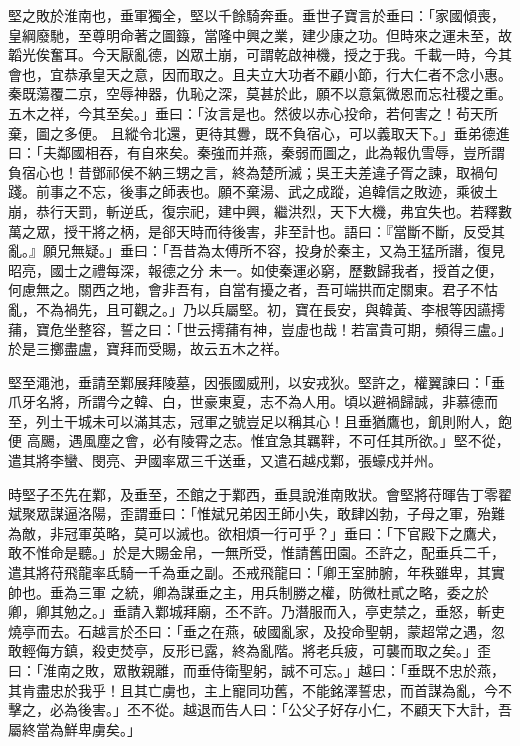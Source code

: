 \begin{pinyinscope}
 堅之敗於淮南也，垂軍獨全，堅以千餘騎奔垂。垂世子寶言於垂曰：「家國傾喪，皇綱廢馳，至尊明命著之圖籙，當隆中興之業，建少康之功。但時來之運未至，故韜光俟奮耳。今天厭亂德，凶眾土崩，可謂乾啟神機，授之于我。千載一時，今其會也，宜恭承皇天之意，因而取之。且夫立大功者不顧小節，行大仁者不念小惠。秦既蕩覆二京，空辱神器，仇恥之深，莫甚於此，願不以意氣微恩而忘社稷之重。五木之祥，今其至矣。」垂曰：「汝言是也。然彼以赤心投命，若何害之！茍天所棄，圖之多便。
 且縱令北還，更待其釁，既不負宿心，可以義取天下。」垂弟德進曰：「夫鄰國相吞，有自來矣。秦強而并燕，秦弱而圖之，此為報仇雪辱，豈所謂負宿心也！昔鄧祁侯不納三甥之言，終為楚所滅；吳王夫差違子胥之諫，取禍句踐。前事之不忘，後事之師表也。願不棄湯、武之成蹤，追韓信之敗迹，乘彼土崩，恭行天罰，斬逆氐，復宗祀，建中興，繼洪烈，天下大機，弗宜失也。若釋數萬之眾，授干將之柄，是郤天時而待後害，非至計也。語曰：『當斷不斷，反受其亂。』願兄無疑。」垂曰：「吾昔為太傅所不容，投身於秦主，又為王猛所譖，復見昭亮，國士之禮每深，報德之分
 未一。如使秦運必窮，歷數歸我者，授首之便，何慮無之。關西之地，會非吾有，自當有擾之者，吾可端拱而定關東。君子不怙亂，不為禍先，且可觀之。」乃以兵屬堅。初，寶在長安，與韓黃、李根等因讌摴蒱，寶危坐整容，誓之曰：「世云摴蒱有神，豈虛也哉！若富貴可期，頻得三盧。」於是三擲盡盧，寶拜而受賜，故云五木之祥。



 堅至澠池，垂請至鄴展拜陵墓，因張國威刑，以安戎狄。堅許之，權翼諫曰：「垂爪牙名將，所謂今之韓、白，世豪東夏，志不為人用。頃以避禍歸誠，非慕德而至，列土干城未可以滿其志，冠軍之號豈足以稱其心！且垂猶鷹也，飢則附人，飽便
 高颺，遇風塵之會，必有陵霄之志。惟宜急其羈靽，不可任其所欲。」堅不從，遣其將李蠻、閔亮、尹國率眾三千送垂，又遣石越戍鄴，張蠔戍并州。



 時堅子丕先在鄴，及垂至，丕館之于鄴西，垂具說淮南敗狀。會堅將苻暉告丁零翟斌聚眾謀逼洛陽，歪謂垂曰：「惟斌兄弟因王師小失，敢肆凶勃，子母之軍，殆難為敵，非冠軍英略，莫可以滅也。欲相煩一行可乎？」垂曰：「下官殿下之鷹犬，敢不惟命是聽。」於是大賜金帛，一無所受，惟請舊田園。丕許之，配垂兵二千，遣其將苻飛龍率氐騎一千為垂之副。丕戒飛龍曰：「卿王室肺腑，年秩雖卑，其實帥也。垂為三軍
 之統，卿為謀垂之主，用兵制勝之權，防微杜貳之略，委之於卿，卿其勉之。」垂請入鄴城拜廟，丕不許。乃潛服而入，亭吏禁之，垂怒，斬吏燒亭而去。石越言於丕曰：「垂之在燕，破國亂家，及投命聖朝，蒙超常之遇，忽敢輕侮方鎮，殺吏焚亭，反形已露，終為亂階。將老兵疲，可襲而取之矣。」歪曰：「淮南之敗，眾散親離，而垂侍衛聖躬，誠不可忘。」越曰：「垂既不忠於燕，其肯盡忠於我乎！且其亡虜也，主上寵同功舊，不能銘澤誓忠，而首謀為亂，今不擊之，必為後害。」丕不從。越退而告人曰：「公父子好存小仁，不顧天下大計，吾屬終當為鮮卑虜矣。」




\end{pinyinscope}
